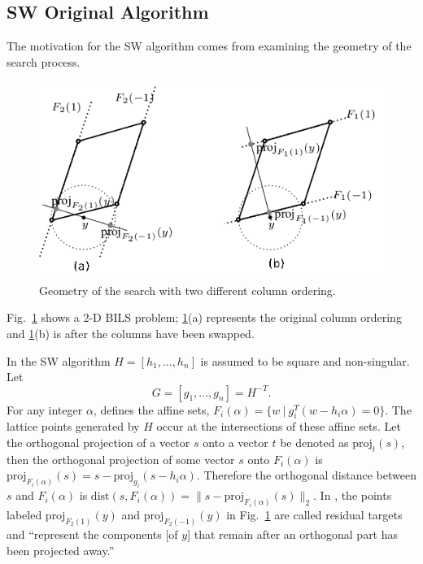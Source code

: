 \documentclass[12pt,Bold,letterpaper]{mcgilletdclass}
\newcommand{\dist}{\mathrm{dist}}
\newcommand{\vsp}{\vspace{\baselineskip}}
\begin{document}
\vsp \subsection{SW Original Algorithm} \label{subsec:SW}
The motivation for the SW algorithm comes from examining the geometry of the search process.

\ifx\du\undefined
  \newlength{\du}
\fi
\begin{figure}
\centering
\includegraphics{sumotivation.png}
\caption{Geometry of the search  with two different column ordering.}
\label{SEGeometry}
\end{figure}

Fig.\ \ref{SEGeometry} shows a 2-D BILS problem;
\ref{SEGeometry}(a) represents the original column ordering and 
\ref{SEGeometry}(b) is after the columns have been swapped.

In the SW algorithm $H=[h_1,\ldots, h_n]$ is assumed to be square and non-singular.
Let 
$$
G =[g_1,\ldots, g_n]= H^{-T}.
$$ 
For any  integer $\alpha$,   \cite{SuW05} defines the
affine sets, $F_i(\alpha) = \{w \ | \ g_i^T(w-h_i\alpha) = 0\}$.
The lattice points generated by $H$ occur at the intersections of these affine sets. 
Let the orthogonal projection of a vector $s$ onto a vector $t$ be denoted as
$\mbox{proj}_t(s)$, then %
the orthogonal projection of some vector $s$ onto $F_i(\alpha)$ is 
$\mbox{proj}_{F_i(\alpha)}(s) = s -\mbox{proj}_{g_i}(s-h_i\alpha).$ 
Therefore the orthogonal distance between $s$ and
$F_i(\alpha)$ is $\dist(s,F_i(\alpha)) =  \| s - \mbox{proj}_{F_i(\alpha)}(s) \|_2$. 
In \cite{SuW05}, the points labeled $\mbox{proj}_{F_2(1)}(y)$ and
$\mbox{proj}_{F_2(-1)}(y)$ in Fig.\  \ref{SEGeometry}
are called residual targets  and ``represent the
components [of $y$] that remain after an orthogonal part has been projected
away.''  
\end{document}
